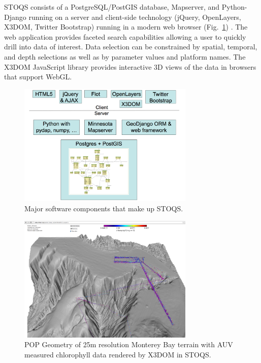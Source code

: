 \documentclass[annualconference]{acmsiggraph}  %
\begin{document}
STOQS consists of a PostgreSQL/PostGIS database, Mapserver, and Python-Django running on a server and client-side technology (jQuery, OpenLayers, X3DOM, Twitter Bootstrap) running in a modern web browser (Fig.~\ref{fig:STOQSArch}) . The web application provides faceted search capabilities allowing a user to quickly drill into data of interest. Data selection can be constrained by spatial, temporal, and depth selections as well as by parameter values and platform names. The X3DOM JavaScript library provides interactive 3D views of the data in browsers that support WebGL.  

\begin{figure}[htbp]
\centering
\includegraphics[width=3.3in]{STOQS_Architecture_withX3DOM.png}
\caption{Major software components that make up STOQS.}
\label{fig:STOQSArch}
\end{figure}




\begin{figure}[htbp]
\centering
\includegraphics[width=3.3in]{Monterey25_lrauvs.png}
\caption{POP Geometry of 25m resolution Monterey Bay terrain with AUV measured chlorophyll data rendered by X3DOM in STOQS.}
\label{fig:Monterey25_lrauvs}
\end{figure}
\end{document}
